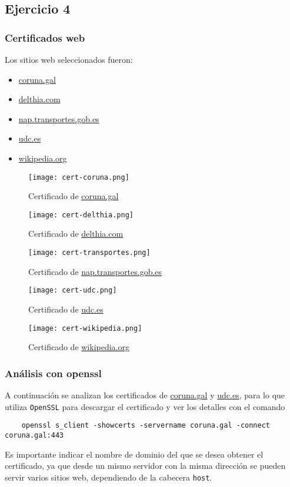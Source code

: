 \subsection{Ejercicio 4}
\graphicspath{ {img/04} }

\subsubsection{Certificados web}

Los sitios web seleccionados fueron:
\begin{itemize}
    \item \href{https://www.coruna.gal}{coruna.gal}
    \item \href{https://delthia.com}{delthia.com}
    \item \href{https://nap.transportes.gob.es}{nap.transportes.gob.es}
    \item \href{https://www.udc.es}{udc.es}
    \item \href{www.wikipedia.org}{wikipedia.org}
\end{itemize}

\begin{figure}[H]   
    \texttt{[image: cert-coruna.png]}
    \caption{Certificado de \url{coruna.gal}}
\end{figure}

\begin{figure}[H]
    \texttt{[image: cert-delthia.png]}
    \caption{Certificado de \url{delthia.com}}
\end{figure}

\begin{figure}[H]
    \texttt{[image: cert-transportes.png]}
    \caption{Certificado de \url{nap.transportes.gob.es}}
\end{figure}

\begin{figure}[H]
    \texttt{[image: cert-udc.png]}
    \caption{Certificado de \url{udc.es}}
\end{figure}

\begin{figure}[H]
    \texttt{[image: cert-wikipedia.png]}
    \caption{Certificado de \url{wikipedia.org}}
\end{figure}

\subsubsection{Análisis con openssl}

A continuación se analizan los certificados de \url{coruna.gal} y \url{udc.es}, para lo que utiliza \texttt{OpenSSL} para descargar el certificado y ver los detalles con el comando

\begin{verbatim}
    openssl s_client -showcerts -servername coruna.gal -connect coruna.gal:443
\end{verbatim}

Es importante indicar el nombre de dominio del que se desea obtener el certificado, ya que desde un mismo servidor con la misma dirección se pueden servir varios sitios web, dependiendo de la cabecera \texttt{host}.
